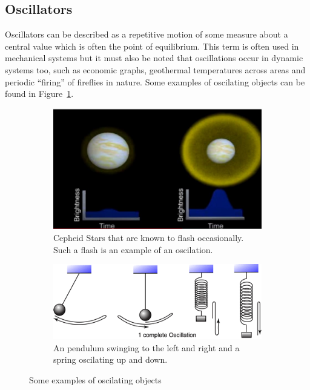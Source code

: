 \label{sec:intro}

\subsection{Oscillators}
Oscillators can be described as a repetitive motion of some measure about a central value which is often the point of equilibrium. This term is often used in mechanical systems but it must also be noted that oscillations occur in dynamic systems too, such as economic graphs, geothermal temperatures across areas and periodic ``firing'' of fireflies in nature. Some examples of oscilating objects can be found in Figure~\ref{fig:intro_samples}. 

\begin{figure}[h]
\centering
\begin{subfigure}{.4\textwidth}
  \centering
  \includegraphics[width=\textwidth]{imgs/cepheid}
  \caption{Cepheid Stars that are known to flash occasionally. Such a flash is an example of an oscilation. }
\end{subfigure}%
\space\space\space
\begin{subfigure}{.5\textwidth}
  \centering
  \includegraphics[width=\textwidth]{imgs/oscillation}
  \caption{An pendulum swinging to the left and right and a spring oscilating up and down. }
\end{subfigure}
\caption{Some examples of oscilating objects}
\label{fig:intro_samples}
\end{figure}



